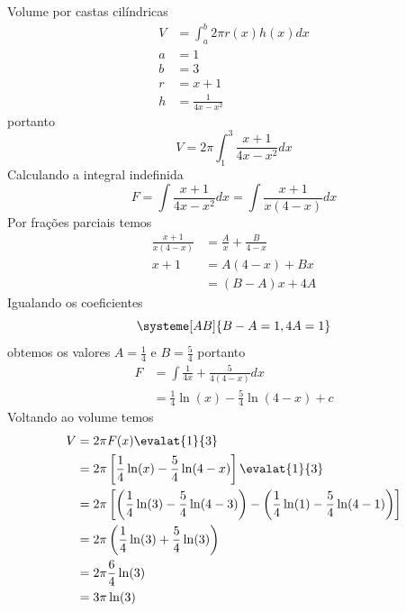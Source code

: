 \documentclass[a4paper,12pt,fleqn]{article}
\begin{document}
\begin{answer}
  Volume por castas cilíndricas
  \begin{align*}
    V & = \int_a^b 2\pi r(x) h(x) dx \\
    a & = 1 \\
    b & = 3 \\
    r & = x+1 \\
    h & = \frac{1}{4x-x^2}
  \end{align*}
  portanto
  \[
    V = 2\pi \int_1^3 \frac{x+1}{4x-x^2} dx
  \]
  Calculando a integral indefinida
  \[
    F = \int \frac{x+1}{4x-x^2} dx = \int \frac{x+1}{x(4-x)} dx
  \]
  Por frações parciais temos
  \begin{align*}
    \frac{x+1}{x(4-x)} & = \frac{A}{x} + \frac{B}{4-x} \\
    x+1                & = A(4-x) + Bx                 \\
                       & = (B-A)x + 4A
  \end{align*}
  Igualando os coeficientes
  \[
    \systeme[AB]{B-A=1,4A=1}
  \]
  obtemos os valores
  \(A=\frac{1}{4}\) e
  \(B=\frac{5}{4}\)
  portanto
  \begin{align*}
    F & = \int \frac{1}{4x} + \frac{5}{4(4-x)} dx \\
      & = \frac{1}{4}\ln(x) - \frac{5}{4}\ln(4-x) + c
  \end{align*}
  Voltando ao volume temos
  \begin{align*}
    V & = 2\pi F(x)\evalat{1}{3} \\
      & = 2\pi \left[\frac{1}{4}\ln(x) - \frac{5}{4}\ln(4-x)\right] \evalat{1}{3} \\
      & = 2\pi \left[
                 \left(\frac{1}{4}\ln(3) - \frac{5}{4}\ln(4-3)\right)
               - \left(\frac{1}{4}\ln(1) - \frac{5}{4}\ln(4-1)\right)
               \right] \\
      & = 2\pi \left(\frac{1}{4}\ln(3) + \frac{5}{4}\ln(3)\right) \\
      & = 2\pi \frac{6}{4}\ln(3) \\
      & = 3\pi \ln(3)
  \end{align*}
\end{answer}

\end{document}
